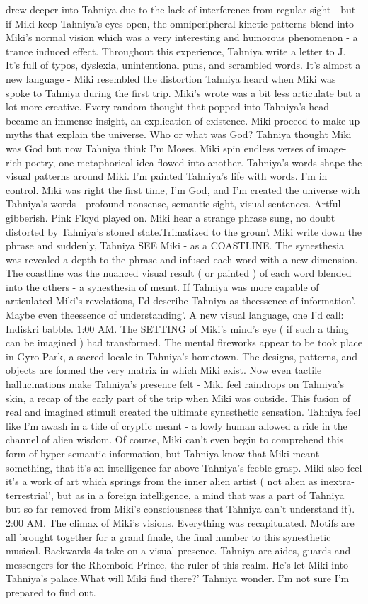 \documentclass[12pt]{book}
\begin{document}
drew deeper into Tahniya due to the lack of interference from regular sight - but if Miki keep Tahniya's eyes open, the omniperipheral kinetic patterns blend into Miki's normal vision which was a very interesting and humorous phenomenon - a trance induced effect. Throughout this experience, Tahniya write a letter to J. It's full of typos, dyslexia, unintentional puns, and scrambled words. It's almost a new language - Miki resembled the distortion Tahniya heard when Miki was spoke to Tahniya during the first trip. Miki's wrote was a bit less articulate but a lot more creative. Every random thought that popped into Tahniya's head became an immense insight, an explication of existence. Miki proceed to make up myths that explain the universe. Who or what was God? Tahniya thought Miki was God but now Tahniya think I'm Moses. Miki spin endless verses of image-rich poetry, one metaphorical idea flowed into another. Tahniya's words shape the visual patterns around Miki. I'm painted Tahniya's life with words. I'm in control. Miki was right the first time, I'm God, and I'm created the universe with Tahniya's words - profound nonsense, semantic sight, visual sentences. Artful gibberish. Pink Floyd played on. Miki hear a strange phrase sung, no doubt distorted by Tahniya's stoned state.Trimatized to the groun'. Miki write down the phrase and suddenly, Tahniya SEE Miki - as a COASTLINE. The synesthesia was revealed a depth to the phrase and infused each word with a new dimension. The coastline was the nuanced visual result ( or painted ) of each word blended into the others - a synesthesia of meant. If Tahniya was more capable of articulated Miki's revelations, I'd describe Tahniya as theessence of information'. Maybe even theessence of understanding'. A new visual language, one I'd call: Indiskri babble. 1:00 AM. The SETTING of Miki's mind's eye ( if such a thing can be imagined ) had transformed. The mental fireworks appear to be took place in Gyro Park, a sacred locale in Tahniya's hometown. The designs, patterns, and objects are formed the very matrix in which Miki exist. Now even tactile hallucinations make Tahniya's presence felt - Miki feel raindrops on Tahniya's skin, a recap of the early part of the trip when Miki was outside. This fusion of real and imagined stimuli created the ultimate synesthetic sensation. Tahniya feel like I'm awash in a tide of cryptic meant - a lowly human allowed a ride in the channel of alien wisdom. Of course, Miki can't even begin to comprehend this form of hyper-semantic information, but Tahniya know that Miki meant something, that it's an intelligence far above Tahniya's feeble grasp. Miki also feel it's a work of art which springs from the inner alien artist ( not alien as inextra-terrestrial', but as in a foreign intelligence, a mind that was a part of Tahniya but so far removed from Miki's consciousness that Tahniya can't understand it). 2:00 AM. The climax of Miki's visions. Everything was recapitulated. Motifs are all brought together for a grand finale, the final number to this synesthetic musical. Backwards 4s take on a visual presence. Tahniya are aides, guards and messengers for the Rhomboid Prince, the ruler of this realm. He's let Miki into Tahniya's palace.What will Miki find there?' Tahniya wonder. I'm not sure I'm prepared to find out. 
\end{document}
